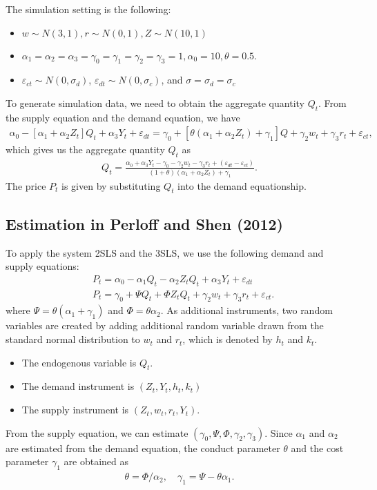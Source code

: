 \documentclass[11pt, a4paper]{article}
\numberwithin{figure}{section}
\theoremstyle{definition}
\newcommand{\0}{\mathbf{0}}
\begin{document}
The simulation setting is the following:
\begin{itemize}
    \item $w \sim N (3, 1), r \sim N (0, 1), Z \sim N (10, 1)$
    \item $\alpha_1 = \alpha_2 = \alpha_3 = \gamma_0 = \gamma_1 = \gamma_2  = \gamma_3 = 1, \alpha_0 = 10, \theta = 0.5.$
    \item $\varepsilon_{ct}\sim N(0,\sigma_d)$, $\varepsilon_{dt} \sim N(0,\sigma_c)$, and $\sigma = \sigma_d = \sigma_c$
\end{itemize}

To generate simulation data, we need to obtain the aggregate quantity $Q_t$.
From the supply equation and the demand equation, we have
\begin{align}
    \alpha_0 - [\alpha_1 + \alpha_2Z_t] Q_t + \alpha_3 Y_t + \varepsilon_{dt} = \gamma_0 + [\theta(\alpha_1 + \alpha_2Z_t)+ \gamma_1] Q   + \gamma_2 w_t + \gamma_3 r_t + \varepsilon_{ct},
\end{align}
which gives us the aggregate quantity $Q_t$ as 
\begin{align*}
    Q_t =  \frac{\alpha_0 + \alpha_3 Y_t - \gamma_0 - \gamma_2 w_t - \gamma_3 r_t + (\varepsilon_{dt} - \varepsilon_{ct})}{(1 + \theta) (\alpha_1 + \alpha_2Z_t) + \gamma_1}.
\end{align*}
The price $P_t$ is given by substituting $Q_t$ into the demand equationship.





\subsection{Estimation in Perloff and Shen (2012)}
To apply the system 2SLS and the 3SLS, we use the following demand and supply equations:
\begin{align*}
    &P_t = \alpha_0 - \alpha_1Q_t - \alpha_2Z_t Q_t + \alpha_3 Y_t + \varepsilon_{dt}\\
    &P_t = \gamma_0 + \Psi Q_t  + \Phi Z_tQ_t  + \gamma_2 w_t + \gamma_3 r_t + \varepsilon_{ct}.
\end{align*}
where $\Psi = \theta(\alpha_1 + \gamma_1)$ and $\Phi = \theta\alpha_2$.
As additional instruments, two random variables are created by adding additional random variable drawn from the standard normal distribution to $w_t$ and $r_t$, which is denoted by $h_t$ and $k_t$. 
\begin{itemize}
    \item The endogenous variable is $Q_t$. 
    \item The demand instrument is $(Z_t, Y_t, h_t, k_t)$
    \item The supply instrument is $(Z_t, w_t, r_t, Y_t)$.
\end{itemize}
From the supply equation, we can estimate $(\gamma_0, \Psi, \Phi, \gamma_2, \gamma_3)$. 
Since $\alpha_1$ and $\alpha_2$ are estimated from the demand equation, the conduct parameter $\theta$ and the cost parameter $\gamma_1$ are obtained as 
\begin{align*}
    \theta = \Phi/\alpha_2, \quad \gamma_1 = \Psi - \theta\alpha_1.
\end{align*}
\end{document}
